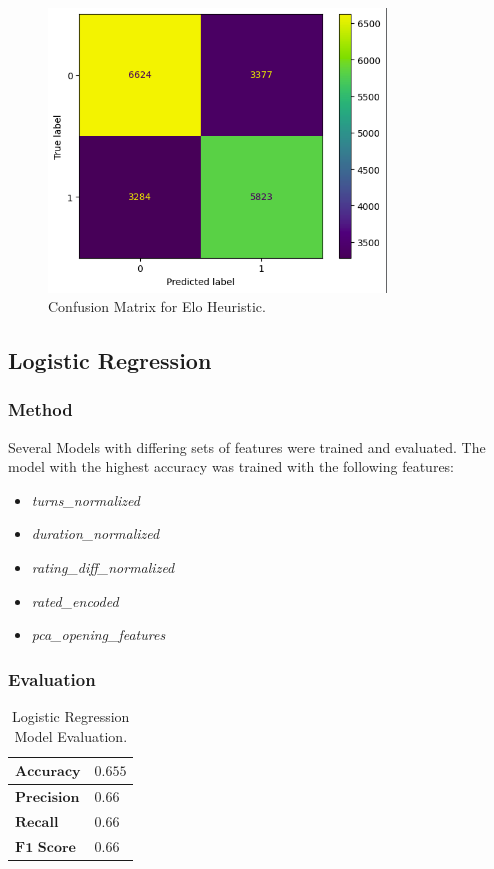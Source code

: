 \documentclass[12pt]{article}
\begin{document}
\begin{figure}[H]
\centering
\includegraphics[width=0.8\textwidth]{conf-matrix-elo.png}
\caption{Confusion Matrix for Elo Heuristic.}
\label{fig:conf-matrix-elo}
\end{figure}

\subsection{Logistic Regression}

\subsubsection{Method}
Several Models with differing sets of features were trained and evaluated. The model with the highest accuracy was trained with the following features:

\begin{itemize}
  \item\textit{turns\_normalized}
  \item\textit{duration\_normalized}
  \item\textit{rating\_diff\_normalized}
  \item\textit{rated\_encoded}
  \item\textit{pca\_opening\_features}
\end{itemize}

\subsubsection{Evaluation}

\begin{table}[h!]
\centering
\begin{tabular}{|l|l|}
\hline
$\textbf{Accuracy}$ & $0.655$ \\ \hline
$\textbf{Precision}$ & $0.66$ \\ \hline
$\textbf{Recall}$ & $0.66$ \\ \hline
$\textbf{F1 Score}$ & $0.66$ \\ \hline
\end{tabular}
\caption{Logistic Regression Model Evaluation.}
\label{tab:lr-eval}
\end{table}
\end{document}
